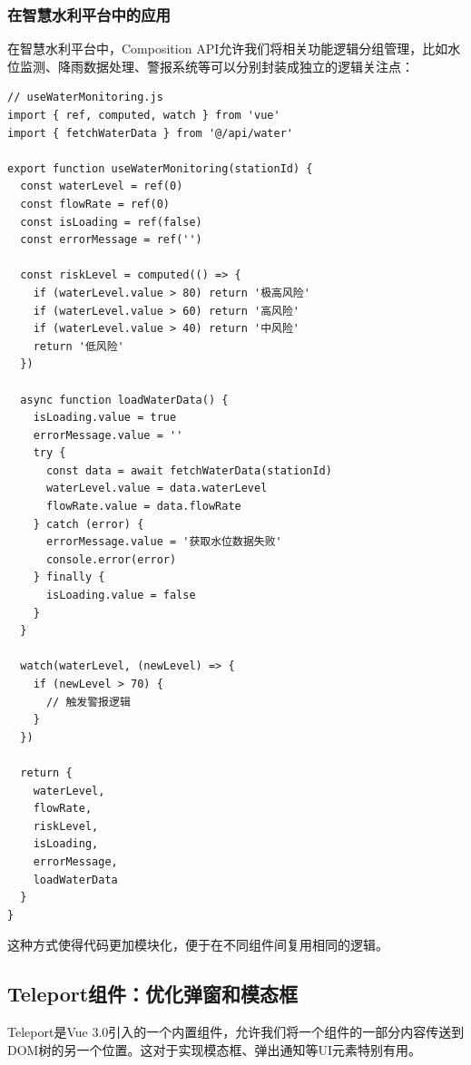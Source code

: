 \subsubsection{在智慧水利平台中的应用}\label{ux5728ux667aux6167ux6c34ux5229ux5e73ux53f0ux4e2dux7684ux5e94ux7528}

在智慧水利平台中，Composition
API允许我们将相关功能逻辑分组管理，比如水位监测、降雨数据处理、警报系统等可以分别封装成独立的逻辑关注点：

\begin{lstlisting}
// useWaterMonitoring.js
import { ref, computed, watch } from 'vue'
import { fetchWaterData } from '@/api/water'

export function useWaterMonitoring(stationId) {
  const waterLevel = ref(0)
  const flowRate = ref(0)
  const isLoading = ref(false)
  const errorMessage = ref('')
  
  const riskLevel = computed(() => {
    if (waterLevel.value > 80) return '极高风险'
    if (waterLevel.value > 60) return '高风险'
    if (waterLevel.value > 40) return '中风险'
    return '低风险'
  })
  
  async function loadWaterData() {
    isLoading.value = true
    errorMessage.value = ''
    try {
      const data = await fetchWaterData(stationId)
      waterLevel.value = data.waterLevel
      flowRate.value = data.flowRate
    } catch (error) {
      errorMessage.value = '获取水位数据失败'
      console.error(error)
    } finally {
      isLoading.value = false
    }
  }
  
  watch(waterLevel, (newLevel) => {
    if (newLevel > 70) {
      // 触发警报逻辑
    }
  })
  
  return {
    waterLevel,
    flowRate,
    riskLevel,
    isLoading,
    errorMessage,
    loadWaterData
  }
}
\end{lstlisting}

这种方式使得代码更加模块化，便于在不同组件间复用相同的逻辑。

\subsection{Teleport组件：优化弹窗和模态框}\label{teleportux7ec4ux4ef6ux4f18ux5316ux5f39ux7a97ux548cux6a21ux6001ux6846}

Teleport是Vue
3.0引入的一个内置组件，允许我们将一个组件的一部分内容传送到DOM树的另一个位置。这对于实现模态框、弹出通知等UI元素特别有用。

